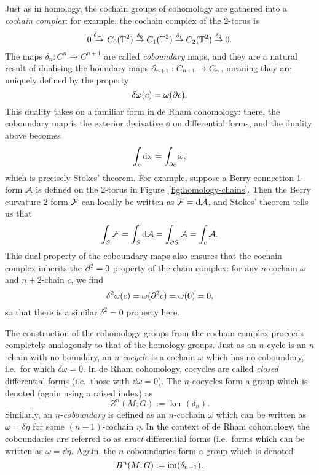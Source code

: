 Just as in homology, the cochain groups of cohomology are gathered into a \emph{cochain complex}: for example, the cochain complex of the 2-torus is
\begin{equation*}
	0 \overset{\delta_{-1}}{\rightarrow} C_0(\mathbb{T}^2) \overset{\delta_0}{\rightarrow} C_1(\mathbb{T}^2) \overset{\delta_1}{\rightarrow} C_2(\mathbb{T}^2) \overset{\delta_2}{\rightarrow} 0.
\end{equation*}
The maps $\delta_n: C^n\to C^{n+1}$ are called \emph{coboundary} maps, and they are a natural result of dualising the boundary maps $\partial_{n+1}: C_{n+1}\to C_n$, meaning they are uniquely defined by the property
\begin{equation}\label{eq:boundary-duality}
	\delta\omega(c) = \omega(\partial c).
\end{equation}
This duality takes on a familiar form in de Rham cohomology: there, the coboundary map is the exterior derivative $\dd$ on differential forms, and the duality above becomes
\begin{equation*}
	\int_{c}\dd{\omega} = \int_{\partial c}\omega,
\end{equation*}
which is precisely Stokes' theorem. For example, suppose a Berry connection 1-form $\mathcal{A}$ is defined on the 2-torus in Figure~\ref{fig:homology-chains}. Then the Berry curvature 2-form $\mathcal{F}$ can locally be written as $\mathcal{F} = \dd{\mathcal{A}}$, and Stokes' theorem tells us that
\begin{equation*}
	\int_{S}\mathcal{F} = \int_{S}\dd{\mathcal{A}} = \int_{\partial S}\mathcal{A} = \int_c\mathcal{A}.
\end{equation*}
This dual property of the coboundary maps also ensures that the cochain complex inherits the $\partial^2 = 0$ property of the chain complex: for any $n$-cochain $\omega$ and $n+2$-chain $c$, we find
\begin{equation*}
	\delta^2\omega(c) = \omega(\partial^2 c) = \omega(0) = 0,
\end{equation*}
so that there is a similar $\delta^2=0$ property here.

The construction of the cohomology groups from the cochain complex proceeds completely analogously to that of the homology groups. Just as an $n$-cycle is an $n$-chain with no boundary, an $n$-\emph{cocycle} is a cochain $\omega$ which has no coboundary, i.e.\ for which $\delta{\omega} = 0$. In de Rham cohomology, cocycles are called \emph{closed} differential forms (i.e.\ those with $\dd{\omega} = 0$). The $n$-cocycles form a group which is denoted (again using a raised index) as
\begin{equation*}
	Z^n(M;G) := \ker(\delta_n).
\end{equation*}
Similarly, an $n$-\emph{coboundary} is defined as an $n$-cochain $\omega$ which can be written as $\omega=\delta{\eta}$ for some $(n-1)$-cochain $\eta$. In the context of de Rham cohomology, the coboundaries are referred to as \emph{exact} differential forms (i.e.\ forms which can be written as $\omega = \dd\eta$. Again, the $n$-coboundaries form a group which is denoted
\begin{equation*}
	B^n(M;G) := \operatorname{im}(\delta_{n-1}).
\end{equation*}

